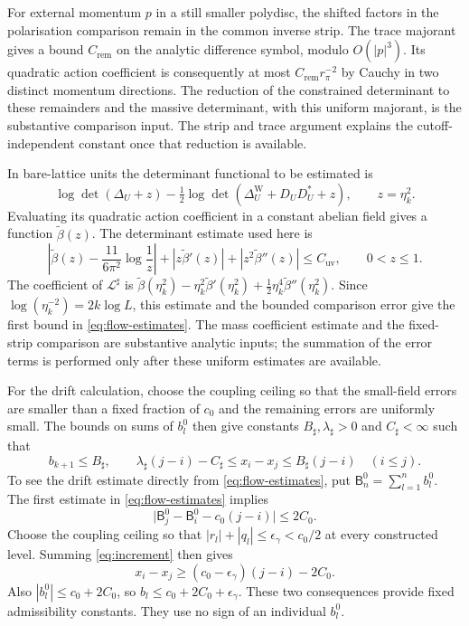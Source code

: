 \documentclass[11pt,letterpaper,reqno]{amsart}
\theoremstyle{definition}
\theoremstyle{remark}
\begin{document}
For external momentum $p$ in
a still smaller polydisc, the
shifted factors in the
polarisation comparison remain
in the common inverse strip.
The trace majorant gives a
bound $C_{\mathrm{rem}}$ on
the analytic difference
symbol, modulo $O(|p|^3)$.
Its quadratic action
coefficient is consequently
at most
$C_{\mathrm{rem}}r_\pi^{-2}$
by Cauchy in two distinct
momentum directions.
The reduction of the
constrained determinant to
these remainders and the
massive determinant, with
this uniform majorant, is
the substantive comparison
input. The strip and trace
argument explains the
cutoff-independent constant
once that reduction is
available.

In bare-lattice units the determinant functional to be estimated
is
\[
 \log\det(\Delta_U+z)
 -\tfrac12\log\det(\Delta_U^{\mathrm W}+D_UD_U^*+z),
 \qquad z=\eta_k^2.
\]
Evaluating its quadratic action coefficient in a constant
abelian field gives a function $\widetilde\beta(z)$.
The determinant estimate used here is
\begin{equation}\label{eq:rg-mass-coefficient}
 \left|\widetilde\beta(z)
      -\frac{11}{6\pi^2}\log\frac1z\right|
 +|z\widetilde\beta'(z)|+|z^2\widetilde\beta''(z)|
 \le C_{\mathrm{uv}},\qquad 0<z\le1.
\end{equation}
The coefficient of $\mathcal L^\sharp$ is
$\widetilde\beta(\eta_k^2)
-\eta_k^2\widetilde\beta'(\eta_k^2)
+\frac12\eta_k^4\widetilde\beta''(\eta_k^2)$.
Since $\log(\eta_k^{-2})=2k\log L$, this estimate and the
bounded comparison error give the first bound in
\eqref{eq:flow-estimates}. The mass coefficient estimate and
the fixed-strip comparison are substantive analytic inputs;
the summation of the error terms is performed only after
these uniform estimates are available.

For the drift calculation, choose the coupling ceiling so that the small-field errors
are smaller than a fixed fraction of $c_0$ and the remaining
errors are uniformly small. The bounds on sums of $b_l^0$
then give constants $B_\sharp,\lambda_\sharp>0$ and
$C_\sharp<\infty$ such that
\begin{equation}\label{eq:flow}
 b_{k+1}\le B_\sharp,\qquad
 \lambda_\sharp(j-i)-C_\sharp
 \le x_i-x_j\le B_\sharp(j-i)\quad(i\le j).
\end{equation}
To see the drift estimate directly from \eqref{eq:flow-estimates}, put
$\mathsf B_n^0=\sum_{l=1}^n b_l^0$. The first estimate in
\eqref{eq:flow-estimates} implies
\[
 \big|\mathsf B_j^0-\mathsf B_i^0-c_0(j-i)\big|\le2C_0.
\]
Choose the coupling ceiling so that
$|r_l|+|q_l|\le\epsilon_\gamma<c_0/2$ at every
constructed level. Summing \eqref{eq:increment} then gives
\[
 x_i-x_j\ge(c_0-\epsilon_\gamma)(j-i)-2C_0.
\]
Also $|b_l^0|\le c_0+2C_0$, so
$b_l\le c_0+2C_0+\epsilon_\gamma$.
These two consequences provide fixed admissibility
constants. They use no sign of an individual $b_l^0$.
\end{document}
